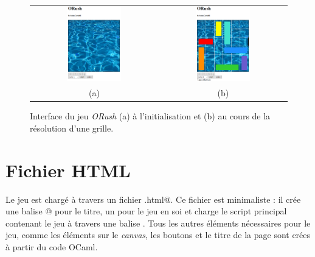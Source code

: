 \documentclass[a4paper,12pt]{article}
\begin{document}
\begin{figure}[ht]
\centering
\begin{tabular}{cc}
\includegraphics[width=0.45\textwidth]{Figures/ORushStart_} & \includegraphics[width=0.45\textwidth]{Figures/ORush_} \tabularnewline
(a) & (b) \tabularnewline
\end{tabular}
\caption{Interface du jeu \emph{ORush} (a) à l'initialisation et (b) au cours de la résolution d'une grille.}
\label{FigORush}
\end{figure}

\section{Fichier HTML}

Le jeu est chargé à travers un fichier \verb@index.html@. Ce fichier est minimaliste : il crée une balise @ pour le titre, un \verb@canvas@ pour le jeu en soi et charge le script principal contenant le jeu à travers une balise \verb@script@. Tous les autres éléments nécessaires pour le jeu, comme les éléments sur le \emph{canvas}, les boutons et le titre de la page sont crées à partir du code OCaml.
\end{document}
